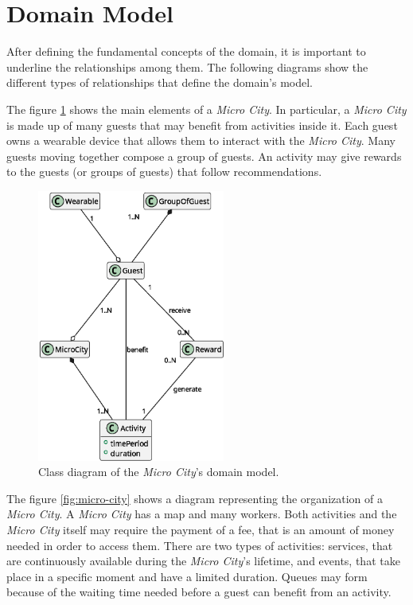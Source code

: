 \section{Domain Model}
\label{sec:model}

After defining the fundamental concepts of the domain, it is important to underline the relationships among them.
The following diagrams show the different types of relationships that define the domain's model.

The figure \ref{fig:domain-overview} shows the main elements of a \textit{Micro City}.
In particular, a \textit{Micro City} is made up of many guests that may benefit from activities inside it.
Each guest owns a wearable device that allows them to interact with the \textit{Micro City}.
Many guests moving together compose a group of guests.
An activity may give rewards to the guests (or groups of guests) that follow recommendations.

\begin{figure}[H]
	\centering
	\includegraphics[width=0.55\textwidth]{./img/domain_overview-0}
	\caption{Class diagram of the \textit{Micro City}'s domain model.}
	\label{fig:domain-overview}
\end{figure}

\newpage

The figure \ref{fig:micro-city} shows a diagram representing the organization of a \textit{Micro City}.
A \textit{Micro City} has a map and many workers.
Both activities and the \textit{Micro City} itself may require the payment of a fee, that is an amount of money needed in order to access them.
There are two types of activities: services, that are continuously available during the \textit{Micro City}'s lifetime, and events, that take place in a specific moment and have a limited duration.
Queues may form because of the waiting time needed before a guest can benefit from an activity.

